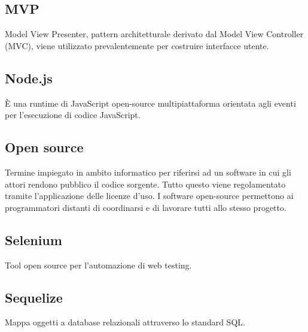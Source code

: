 \documentclass[../manuale_sviluppatore.tex]{subfiles}
\begin{document}
\subsection*{MVP}
{}
Model View Presenter, pattern architetturale derivato dal Model View Controller (MVC), viene 
utilizzato prevalentemente per costruire interfacce utente.

\subsection*{Node.js}
{}
È una runtime di JavaScript open-source multipiattaforma orientata agli eventi per l'esecuzione di 
codice JavaScript.

\subsection*{Open source}
{}
Termine impiegato in ambito informatico per riferirsi ad un software in cui gli attori rendono 
pubblico il codice sorgente. Tutto questo viene regolamentato tramite l'applicazione delle licenze 
d'uso. I software open-source permettono ai programmatori distanti di coordinarsi e di lavorare 
tutti allo stesso progetto.

\subsection*{Selenium}
{}
Tool open source per l'automazione di web testing.

\subsection*{Sequelize}
{}
Mappa oggetti a database relazionali attraverso lo standard SQL.
\end{document}
